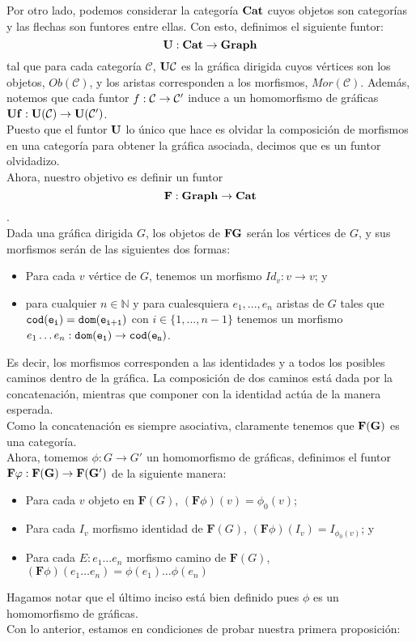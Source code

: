 \documentclass[../main.tex]{subfiles}
\begin{document}
Por otro lado, podemos considerar la categoría \( \bf{Cat} \) cuyos objetos son categorías y las flechas son funtores entre ellas. Con esto, definimos el siguiente funtor:
\[
	\bf{U} : \bf{Cat} \to \bf{Graph}
\]
tal que para cada categoría $\mathcal{C}$, $\bf{U}\mathcal{C}$ es la gráfica dirigida cuyos vértices son los objetos, $Ob(\mathcal{C})$, y los aristas corresponden a los morfismos, $Mor(\mathcal{C})$. Además, notemos que cada funtor $f: \cal{C} \to \cal{C'}$ induce a un homomorfismo de gráficas $\bf{U} f: \bf{U}(\cal{C}) \to \bf{U}(\cal{C'})$. \\
Puesto que el funtor $\bf{U}$ lo único que hace es olvidar la composición de morfismos en una categoría para obtener la gráfica asociada, decimos que es un funtor olvidadizo. \\
Ahora, nuestro objetivo es definir un funtor $$\bf{F}: \bf{Graph} \to \bf{Cat}$$. \\
Dada una gráfica dirigida $G$, los objetos de $\bf{F}G$ serán los vértices de $G$, y sus morfismos serán de las siguientes dos formas:
\begin{itemize}
	\item Para cada $v$ vértice de $G$, tenemos un morfismo $Id_v: v \to v$; y
	\item para cualquier $n \in \mathbb{N}$ y para cualesquiera $e_1, ... , e_n$ aristas de $G$ tales que $\tt{cod} (e_i)=\tt{dom} (e_{i+1})$ con $i \in \{ 1, ..., n-1\}$ tenemos un morfismo $e_1 \dots e_n : \tt{dom} (e_1) \to \tt{cod} (e_n)$.
\end{itemize}
Es decir, los morfismos corresponden a las identidades y a todos los posibles caminos dentro de la gráfica. La composición de dos caminos está dada por la concatenación, mientras que componer con la identidad actúa de la manera esperada. \\ 
Como la concatenación es siempre asociativa, claramente tenemos que $\bf{F}(G)$ es una categoría. \\
Ahora, tomemos $\phi: G \to G'$ un homomorfismo de gráficas, definimos el funtor $\bf{F}\phi: \bf{F}(G) \to \bf{F}(G')$ de la siguiente manera:   
\begin{itemize}
	\item Para cada $v$ objeto en $\mathbf{F} (G)$, $(\mathbf{F}\phi)(v)=\phi_0(v) $;
	\item Para cada $I_v$ morfismo identidad de $\mathbf{F} (G)$, $(\mathbf{F}\phi)(I_v)=I_{\phi_0(v)} $; y 
	\item Para cada $E:e_1 \dots e_n$ morfismo camino de $\mathbf{F} (G)$, $(\mathbf{F}\phi)(e_1 \dots e_n)=\phi(e_1) \dots \phi(e_n)$
\end{itemize}
Hagamos notar que el último inciso está bien definido pues $\phi$ es un homomorfismo de gráficas. \\
Con lo anterior, estamos en condiciones de probar nuestra primera proposición: 
\end{document}
